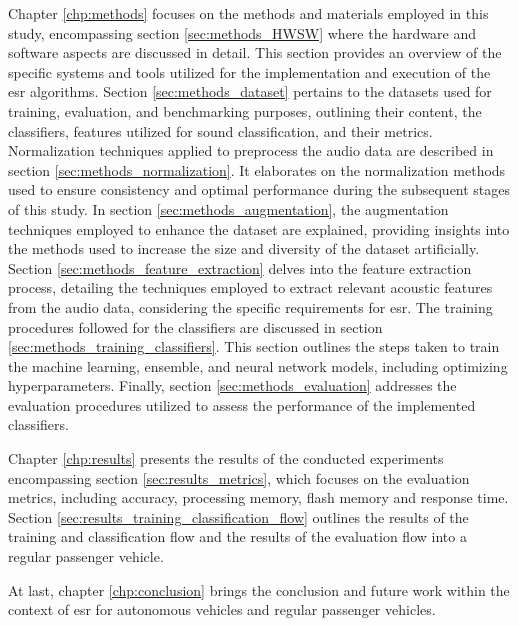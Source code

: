 Chapter \ref{chp:methods} focuses on the methods and materials employed in this study, encompassing section \ref{sec:methods_HWSW} where the hardware and software aspects are discussed in detail. This section provides an overview of the specific systems and tools utilized for the implementation and execution of the \gls{esr} algorithms. Section \ref{sec:methods_dataset} pertains to the datasets used for training, evaluation, and benchmarking purposes, outlining their content, the classifiers, features utilized for sound classification, and their metrics. Normalization techniques applied to preprocess the audio data are described in section \ref{sec:methods_normalization}. It elaborates on the normalization methods used to ensure consistency and optimal performance during the subsequent stages of this study. In section \ref{sec:methods_augmentation}, the augmentation techniques employed to enhance the dataset are explained, providing insights into the methods used to increase the size and diversity of the dataset artificially. Section \ref{sec:methods_feature_extraction} delves into the feature extraction process, detailing the techniques employed to extract relevant acoustic features from the audio data, considering the specific requirements for \gls{esr}. The training procedures followed for the classifiers are discussed in section \ref{sec:methods_training_classifiers}. This section outlines the steps taken to train the machine learning, ensemble, and neural network models, including optimizing hyperparameters. Finally, section \ref{sec:methods_evaluation} addresses the evaluation procedures utilized to assess the performance of the implemented classifiers.

Chapter \ref{chp:results} presents the results of the conducted experiments encompassing section \ref{sec:results_metrics}, which focuses on the evaluation metrics, including accuracy, processing memory, flash memory and response time. Section \ref{sec:results_training_classification_flow} outlines the results of the training and classification flow and the results of the evaluation flow into a regular passenger vehicle.

At last, chapter \ref{chp:conclusion} brings the conclusion and future work within the context of \gls{esr} for autonomous vehicles and regular passenger vehicles.


